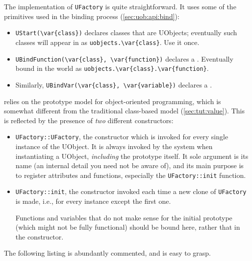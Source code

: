 

The implementation of \lstinline|UFactory| is quite straightforward.
It uses some of the primitives used in the binding process
(\autoref{sec:uob:api:bind}):
\begin{itemize}
\item \lstinline|UStart(\var{class})| declares classes that are
  UObjects; eventually such classes will appear in \us as
  \lstinline|uobjects.\var{class}|.  Use it once.

\item \lstinline|UBindFunction(\var{class}, \var{function})| declares
  a .  Eventually bound in the \us world as
  \lstinline|uobjects.\var{class}.\var{function}|.

\item Similarly, \lstinline|UBindVar(\var{class}, \var{variable})|
  declares a .
\end{itemize}

\urbi relies on the prototype model for object-oriented programming,
which is somewhat different from the traditional \Cxx class-based
model (\autoref{sec:tut:value}).  This is reflected by the presence of
\emph{two} different constructors:
\begin{itemize}
\item \lstinline|UFactory::UFactory|, the \Cxx constructor which is
  invoked for every single instance of the UObject.  It is always
  invoked by the \urbi system when instantiating a UObject,
  \emph{including} the prototype itself.  It sole argument is its name
  (an internal detail you need not be aware of), and its main purpose
  is to register attributes and functions, especially the
  \lstinline|UFactory::init| function.

\item \lstinline|UFactory::init|, the \urbi constructor invoked each
  time a new clone of \lstinline|UFactory| is made, i.e., for every
  instance except the first one.

  Functions and variables that do not make sense for the initial
  prototype (which might not be fully functional) should be bound
  here, rather that in the \Cxx constructor.
\end{itemize}

The following listing is abundantly commented, and is easy to grasp.



